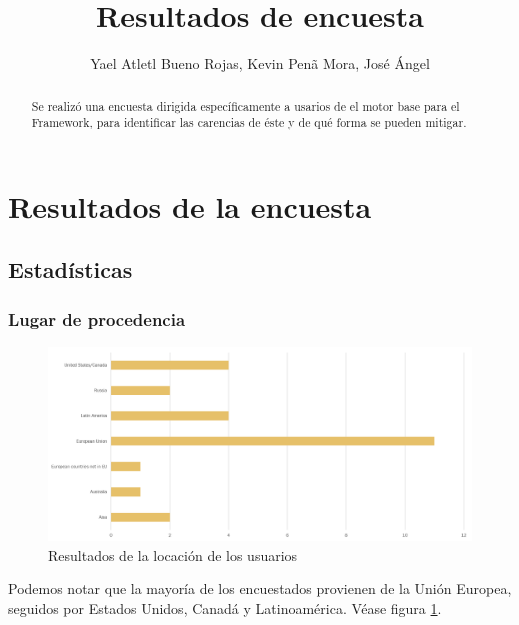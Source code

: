 \documentclass[]{article}
\title{Resultados de encuesta}
\author{Yael Atletl Bueno Rojas, Kevin Pen\~a Mora, Jos\'e \'Angel }
\begin{document}
	\maketitle
\begin{abstract}
	Se realiz\'o una encuesta dirigida espec\'ificamente a usarios de el motor base para el Framework, para identificar las carencias de \'este y de qu\'e forma se pueden mitigar. 
\end{abstract}
\tableofcontents

\section{Resultados de la encuesta}
\subsection{Estad\'isticas }
\subsubsection{Lugar de procedencia}
\begin{figure}[H]
	
	\centering
	\includegraphics[width=1\textwidth]{Encuesta_lugar}
	\caption{Resultados de la locaci\'on de los usuarios} 
	\label{LUGAR}
	
\end{figure}
Podemos notar que la mayor\'ia de los encuestados provienen de la Uni\'on Europea, seguidos por Estados Unidos, Canad\'a y Latinoam\'erica. V\'ease figura \ref{LUGAR}.
\end{document}
